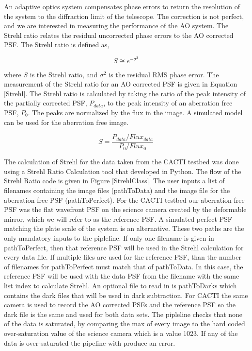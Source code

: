 \documentclass[12pt]{spieman}  %
\begin{document}
\begin{spacing}{2}
An adaptive optics system compensates phase errors to return the resolution of the system to the diffraction limit of the telescope. The correction is not perfect, and we are interested in measuring the performance of the AO system. The Strehl ratio relates the residual uncorrected phase errors to the AO corrected PSF. The Strehl ratio is defined as,

\begin{equation}
    S \cong e^{-\sigma^2}
\end{equation}

where $S$ is the Strehl ratio, and $\sigma^2$ is the residual RMS phase error. The measurement of the Strehl ratio for an AO corrected PSF is given in Equation \ref{Strehl}. The Strehl ratio is calculated by taking the ratio of the peak intensity of the partially corrected PSF, $P_{data}$,  to the peak intensity of an aberration free PSF, $P_0$. The peaks are normalized by the flux in the image. A simulated model can be used for the aberration free image. 

\begin{equation}
    S=\frac{P_{data}/Flux_{data}}{P_{0}/Flux_{0}}
    \label{Strehl}
\end{equation}

The calculation of Strehl for the data taken from the CACTI testbed was done using a Strehl Ratio Calculation tool that developed in Python. The flow of the Strehl Ratio code is given in Figure \ref{StrehlClass}. The user inputs a list of filenames containing the image files (pathToData) and the image file for the aberration free PSF (pathToPerfect). For the CACTI testbed our aberration free PSF was the flat wavefront PSF on the science camera created by the deformable mirror, which we will refer to as the reference PSF. A simulated perfect PSF matching the plate scale of the system is an alternative. These two paths are the only mandatory inputs to the pipleline. If only one filename is given in pathToPerfect, then that reference PSF will be used in the Strehl calculation for every data file. If multiple files are used for the reference PSF, than the number of filenames for pathToPerfect must match that of pathToData. In this case, the reference PSF will be used with the data PSF from the filename with the same list index to calculate Strehl. An optional file to read in is pathToDarks which contains the dark files that will be used in dark subtraction. For CACTI the same camera is used to record the AO corrected PSFs and the reference PSF so the dark file is the same and used for both data sets. The pipleline checks that none of the data is saturated, by comparing the max of every image to the hard coded over-saturation value of the science camera which is a value 1023. If any of the data is over-saturated the pipeline with produce an error.


\end{spacing}
\end{document}
